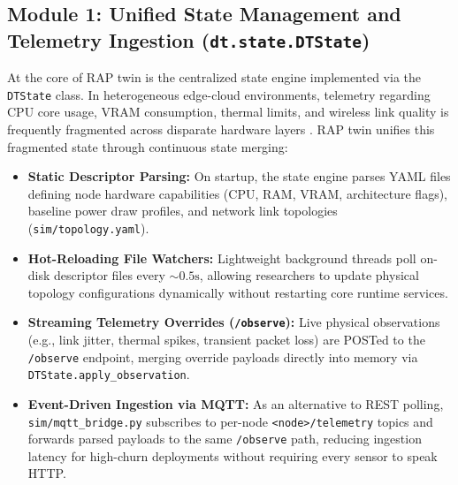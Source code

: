 \documentclass[twoside,twocolumn,10pt]{article}
\begin{document}
\subsection{Module 1: Unified State Management and Telemetry Ingestion (\texttt{dt.state.DTState})}
At the core of RAP twin is the centralized state engine implemented via the \texttt{DTState} class. In heterogeneous edge-cloud environments, telemetry regarding CPU core usage, VRAM consumption, thermal limits, and wireless link quality is frequently fragmented across disparate hardware layers \cite{qi2019, fuller2020}. RAP twin unifies this fragmented state through continuous state merging:

\begin{itemize}
    \item \textbf{Static Descriptor Parsing:} On startup, the state engine parses YAML files defining node hardware capabilities (CPU, RAM, VRAM, architecture flags), baseline power draw profiles, and network link topologies (\texttt{sim/topology.yaml}).
    \item \textbf{Hot-Reloading File Watchers:} Lightweight background threads poll on-disk descriptor files every $\sim 0.5\text{s}$, allowing researchers to update physical topology configurations dynamically without restarting core runtime services.
    \item \textbf{Streaming Telemetry Overrides (\texttt{/observe}):} Live physical observations (e.g., link jitter, thermal spikes, transient packet loss) are POSTed to the \texttt{/observe} endpoint, merging override payloads directly into memory via \texttt{DTState.apply\_observation}.
    \item \textbf{Event-Driven Ingestion via MQTT:} As an alternative to REST polling, \texttt{sim/mqtt\_bridge.py} subscribes to per-node \texttt{<node>/telemetry} topics and forwards parsed payloads to the same \texttt{/observe} path, reducing ingestion latency for high-churn deployments without requiring every sensor to speak HTTP.
\end{itemize}
\end{document}
